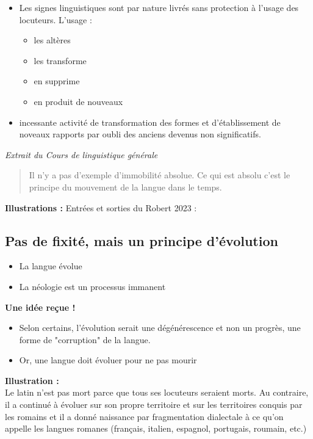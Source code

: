 \begin{itemize}
   \item Les signes linguistiques sont par nature livrés sans protection à l'usage des locuteurs. L'usage :
      \begin{itemize}
         \item les altères 
         \item les transforme
         \item en supprime 
         \item en produit de nouveaux
      \end{itemize}
   \item incessante activité de transformation des formes et d'établissement de noveaux rapports par oubli des anciens devenus non significatifs.
\end{itemize}

\emph{Extrait du \textit{Cours de linguistique générale}}
\begin{quote}
      Il n’y a pas d’exemple d’immobilité
absolue. Ce qui est absolu c’est le
principe du mouvement de la
langue dans le temps.
\end{quote}

\textbf{Illustrations :}
Entrées et sorties du Robert 2023 :\\

 \subsection{Pas de fixité, mais un principe d'évolution}
\begin{itemize} 
         \item La langue évolue
         \item La néologie est un processus immanent
\end{itemize}

\textbf{Une idée reçue !}
\begin{itemize}
         \item Selon certains, l'évolution serait une dégénérescence et non un progrès, une forme de "corruption" de la langue.
         \item Or, une langue doit évoluer pour ne pas mourir
\end{itemize}

\textbf{Illustration :}\\
Le latin n’est pas mort parce que
tous ses locuteurs seraient morts.
Au contraire, il a continué à
évoluer sur son propre territoire
et sur les territoires conquis par
les romains et il a donné
naissance par fragmentation
dialectale à ce qu’on appelle les
langues romanes (français, italien,
espagnol, portugais, roumain,
etc.)

